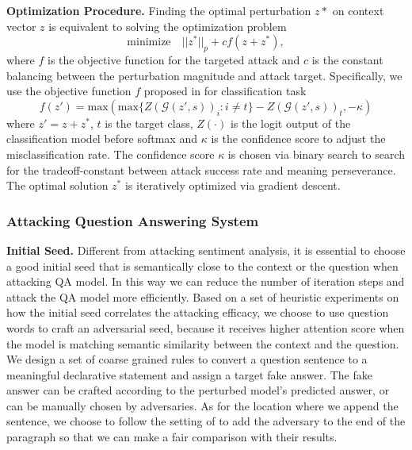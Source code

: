 \textbf{Optimization Procedure.}  Finding the optimal perturbation $z*$ on context vector $z$ is equivalent to solving the optimization problem
\begin{equation}
    \text{minimize} \quad ||z^*||_p + c  f(z + z^*),
    \label{cw}
\end{equation}
where $f$ is the objective function for the targeted attack and $c$ is the constant balancing between the perturbation magnitude and attack target. Specifically, we use the objective function $f$ proposed in \citet{cw} for classification task
\begin{equation}
        f(z') = \text{max}(\text{max}\{Z(\mathcal{G}(z', s))_i:i \neq t\} - Z(\mathcal{G}(z', s))_t, -\kappa)
\end{equation}
where $z'=z+z^*$, $t$ is the target class, $Z(\cdot)$ is the logit output of the classification model before softmax and $\kappa$ is the confidence score to adjust the misclassification rate. The confidence score $\kappa$ is chosen via binary search to search for the tradeoff-constant between attack success rate and meaning perseverance. The optimal solution $z^*$ is iteratively optimized via gradient descent.



\subsubsection{Attacking Question Answering System}
\quad \newline
\textbf{Initial Seed.} Different from attacking sentiment analysis, it is essential to choose a good initial seed that is semantically close to the context or the question when attacking QA model. In this way we can reduce the number of iteration steps and attack the QA model more efficiently. Based on a set of heuristic experiments on how the initial seed correlates the attacking efficacy, we choose to use question words to craft an adversarial seed, because it receives higher attention score when the model is matching semantic similarity between the context and the question. 
We design a set of coarse grained rules to convert a question sentence to a meaningful declarative statement and assign a target fake answer. The fake answer can be crafted according to the perturbed model's predicted answer, or can be manually chosen by adversaries. 
As for the location where we append the sentence, we choose to follow the setting of \citeauthor{jia-liang-2017-adversarial} to add the adversary to the end of the paragraph so that we can make a fair comparison with their results.

